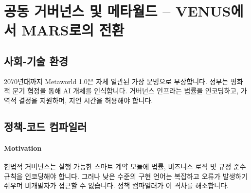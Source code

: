 \documentclass[11pt]{article}
\begin{document}
\section{공동 거버넌스 및 메타월드 -- VENUS에서 MARS로의 전환}
\subsection{사회-기술 환경}
2070년대까지 Metaworld 1.0은 자체 일관된 가상 문명으로 부상합니다. 정부는 평화적 분기 협정을 통해 AI 개체를 인식합니다. 거버넌스 인프라는 법률을 인코딩하고, 가역적 결정을 지원하며, 지연 시간을 허용해야 합니다.

\subsection{정책-코드 컴파일러}
\label{sec:policy-compiler}
\paragraph{Motivation} 헌법적 거버넌스는 실행 가능한 스마트 계약 모듈에 법률, 비즈니스 로직 및 규정 준수 규칙을 인코딩해야 합니다. 그러나 낮은 수준의 구현 언어는 복잡하고 오류가 발생하기 쉬우며 비개발자가 접근할 수 없습니다. 정책 컴파일러가 이 격차를 해소합니다.
\end{document}
